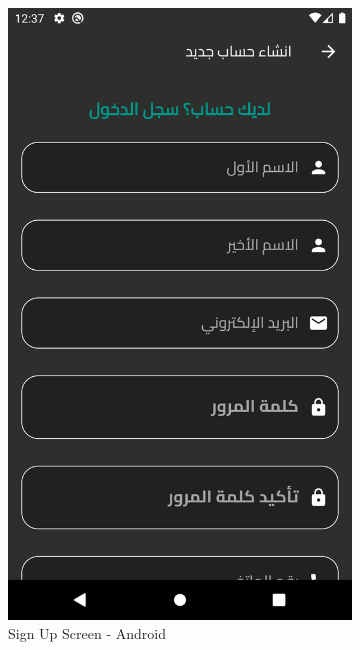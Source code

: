 \documentclass[a4paper, 12pt]{report} %
\begin{document}
\begin{figure}[H]
\begin{subfigure}{0.3\textwidth}
                    \includegraphics[width=0.8\linewidth, height=0.9\textheight, keepaspectratio]{Images/user_sign_up_1.png}
                    \caption{Sign Up Screen - Android}
                    \label{fig:real_sign_up_1}
                \end{subfigure}
                \begin{subfigure}{0.3\textwidth}

\end{subfigure}
\end{figure}
\end{document}
